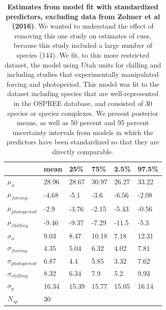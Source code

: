 \documentclass{article}
\begin{document}
\begin{footnotesize}
\begin{table}[ht]
\centering
\caption{\textbf{Estimates from model fit with standardized predictors, excluding data from Zohner et al (2016)}. We wanted to understand the effect of removing this one study on estimates of cues, because this study included a large number of species (144). We fit, to this more restricted dataset, the model using Utah units for chilling and including studies that experimentally manipulated forcing and photoperiod. This model was fit to the dataset including species that are well-represented in the OSPREE database, and consisted of 30 species or species complexes. We present posterior means, as well as 50 percent and 95 percent uncertainty intervals from models in which the predictors have been standardized so that they are directly comparable.} 
\label{tab:nozohn}
\begingroup\footnotesize
\begin{tabular}{|p{}|p{}p{}p{}p{}p{}|}
  \hline
 & mean & 25\% & 75\% & 2.5\% & 97.5\% \\ 
  \hline
$\mu_{\alpha}$ & 28.96 & 28.67 & 30.97 & 26.27 & 33.22 \\ 
  $\mu_{forcing}$ & -4.68 & -5.1 & -3.6 & -6.56 & -2.08 \\ 
  $\mu_{photoperiod}$ & -2.9 & -3.76 & -2.15 & -5.43 & -0.56 \\ 
  $\mu_{chilling}$ & -9.46 & -9.37 & -7.29 & -11.5 & -5.3 \\ 
  $\sigma_{\alpha}$ & 9.03 & 8.47 & 10.18 & 7.18 & 12.31 \\ 
  $\sigma_{forcing}$ & 4.35 & 5.04 & 6.32 & 4.02 & 7.81 \\ 
  $\sigma_{photoperiod}$ & 6.87 & 4.4 & 5.85 & 3.32 & 7.62 \\ 
  $\sigma_{chilling}$ & 8.32 & 6.34 & 7.9 & 5.2 & 9.93 \\ 
  $\sigma_{y}$ & 16.34 & 15.39 & 15.77 & 15.05 & 16.14 \\ 
   \hline
$N_{sp}$ & 30 &  &  &  &  \\ 
   \hline
\end{tabular}
\endgroup
\end{table}


\end{footnotesize}
\end{document}
